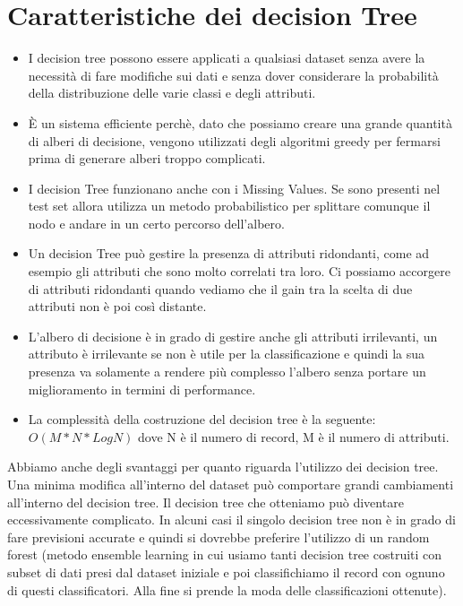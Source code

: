 \documentclass[14pt]{extreport}
\begin{document}
\section{Caratteristiche dei decision Tree}

\begin{itemize}
    \item I decision tree possono essere applicati a qualsiasi dataset senza avere la necessità di fare modifiche sui dati e senza dover considerare la probabilità della distribuzione delle varie classi e degli attributi.
    \item È un sistema efficiente perchè, dato che possiamo creare una grande quantità di alberi di decisione, vengono utilizzati degli algoritmi greedy per fermarsi prima di generare alberi troppo complicati.
    \item I decision Tree funzionano anche con i Missing Values.  Se sono presenti nel test set allora utilizza un metodo probabilistico per splittare comunque il nodo e andare in un certo percorso dell'albero.
    \item Un decision Tree può gestire la presenza di attributi ridondanti, come ad esempio gli attributi che sono molto correlati tra loro. Ci possiamo accorgere di attributi ridondanti quando vediamo che il gain tra la scelta di due attributi non è poi così distante.
    \item L'albero di decisione è in grado di gestire anche gli attributi irrilevanti, un attributo è irrilevante se non è utile per la classificazione e quindi la sua presenza va solamente a rendere più complesso l'albero senza portare un miglioramento in termini di performance.
    \item La complessità della costruzione del decision tree è la seguente: $O(M*N*Log N)$ dove N è il numero di record, M è il numero di attributi.
 
\end{itemize}

Abbiamo anche degli svantaggi per quanto riguarda l'utilizzo dei decision tree.
Una minima modifica all'interno del dataset può comportare grandi cambiamenti all'interno del decision tree.
Il decision tree che otteniamo può diventare eccessivamente complicato.
In alcuni casi il singolo decision tree non è in grado di fare previsioni accurate e quindi si dovrebbe preferire l'utilizzo di un random forest (metodo ensemble learning in cui usiamo tanti decision tree costruiti con subset di dati presi dal dataset iniziale e poi classifichiamo il record con ognuno di questi classificatori. Alla fine si prende la moda delle classificazioni ottenute).
\end{document}
